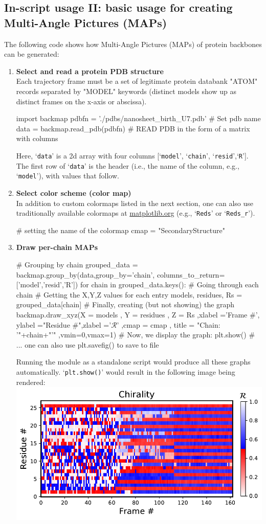 \documentclass[fleqn,10pt,lineno]{wlpeerj} %
\def\ContinueLineNumber{\lstset{firstnumber=last}}
\newcommand{\n}[1]{{\color{red}#1}}
\newcommand{\code}[1]{\texttt{#1}\xspace}
\begin{document}
\subsection*{In-script usage II: basic usage for creating Multi-Angle Pictures (MAPs)}
The following code shows how Multi-Angle Pictures (MAPs) of protein backbones can be generated:
\begin{enumerate}
\item {\bf Select and read a protein PDB structure}\\
Each trajectory frame must be a set of legitimate protein databank "ATOM" records separated by "MODEL" keywords (distinct models show up as distinct frames on the x-axis or abscissa).
\begin{python}[firstnumber=1]
import backmap 
pdbfn = './pdbs/nanosheet_birth_U7.pdb' # Set pdb name 
data = backmap.read_pdb(pdbfn) # READ PDB in the form of a matrix with columns
\end{python}
Here, `\code{data}' is a 2d array with four columns [`\code{model}', `\code{chain}', `\code{resid}',`\code{R}']. 
The first row of `\code{data}' is the header (i.e., the name of the column, e.g., `\code{model}'), 
with values that follow.
\item {\bf Select color scheme (color map)}\\
In addition to custom colormaps listed in the next section, one can also use \n{traditionally} available colormaps at 
\href{http://matplotlib.org/examples/color/colormaps_reference.htm}{matplotlib.org} (e.g., `\code{Reds}' or `\code{Reds\_r}').
\ContinueLineNumber
\begin{python}
# setting the name of the colormap
cmap = "SecondaryStructure"
\end{python}
\item {\bf Draw per-chain MAPs}
\ContinueLineNumber
\begin{python}
# Grouping by chain
grouped_data = backmap.group_by(data,group_by='chain',
                            columns_to_return=['model','resid','R'])
for chain in grouped_data.keys(): # Going through each chain
	# Getting the X,Y,Z values for each entry
	models, residues, Rs = grouped_data[chain]
	# Finally, creating (but not showing) the graph 
	backmap.draw_xyz(X = models  ,      Y = residues  ,     Z = Rs
	           ,xlabel ='Frame #', ylabel ="Residue #",zlabel ='$\mathcal{R}$'
	             ,cmap = cmap    ,  title = "Chain: '"+chain+"'"
	             ,vmin=0,vmax=1)
	# Now, we display the graph:
	plt.show() # ... one can also use plt.savefig() to save to file
\end{python}
Running the module as a standalone script would produce all these graphs automatically.
`\code{plt.show()}' would result in the following image being rendered:\\
\includegraphics[width=0.5\linewidth]{automated_figures/example.pdf}


\end{enumerate}
\end{document}
